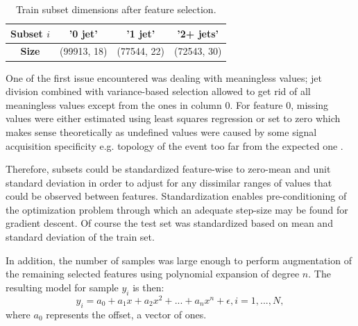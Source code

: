 \documentclass[10pt,conference,compsocconf]{IEEEtran}
\begin{document}
\begin{table}[]
    \centering
     \caption{Train subset dimensions after feature selection.}
    \label{tab:subset}
    \begin{tabular}{|c|c|c|c|}
    \hline
    \textbf{Subset} $i$ &  '0 jet' &  '1 jet' & '2+ jets' \\
    \hline
    \textbf{Size} & (99913, 18) & (77544, 22) & (72543, 30) \\
    \hline
     \end{tabular}
\end{table}

One of the first issue encountered was dealing with meaningless values; jet division combined with variance-based selection allowed to get rid of all meaningless values except from the ones in column 0.
For feature 0, missing values were either estimated using least squares regression or set to zero which makes sense theoretically as undefined values were caused by some signal acquisition specificity e.g. topology of the event too far from the expected one \cite{info}.




Therefore, subsets could be standardized feature-wise to zero-mean and unit standard deviation in order to adjust for any dissimilar ranges of values that could be observed between features. Standardization enables pre-conditioning of the optimization problem through which an adequate step-size may be found for gradient descent.
Of course the test set was standardized based on mean and standard deviation of the train set.

In addition, the number of samples was large enough to perform augmentation of the remaining selected features using polynomial expansion of degree $n$. The resulting model for sample $y_i$ is then:
\begin{equation}
y_i = a_0 + a_1x + a_2x^2 + ... + a_nx^n + \epsilon, i = 1, ... ,N,
\end{equation}
where $a_0$ represents the offset, a vector of ones.
\end{document}
